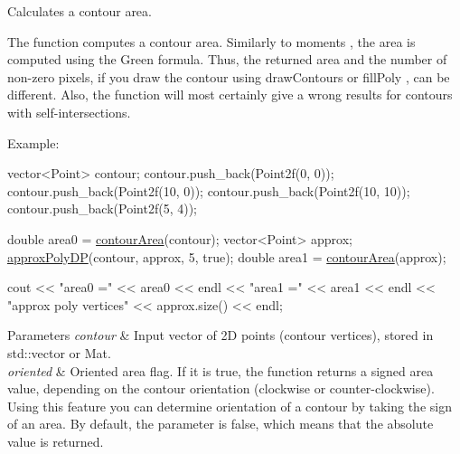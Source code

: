 Calculates a contour area. 

The function computes a contour area. Similarly to moments , the area is computed using the Green formula. Thus, the returned area and the number of non-\/zero pixels, if you draw the contour using draw\+Contours or fill\+Poly , can be different. Also, the function will most certainly give a wrong results for contours with self-\/intersections. 

Example\+: 
\begin{DoxyPre}
\begin{DoxyCode}
vector<Point> contour;
contour.push\_back(Point2f(0, 0));
contour.push\_back(Point2f(10, 0));
contour.push\_back(Point2f(10, 10));
contour.push\_back(Point2f(5, 4));

\textcolor{keywordtype}{double} area0 = \hyperlink{group__imgproc__shape_ga5de110872b0023d4176fcc7c3f2c6115}{contourArea}(contour);
vector<Point> approx;
\hyperlink{group__imgproc__shape_ga59b2a13c4f741e0898f8415d9436d8a0}{approxPolyDP}(contour, approx, 5, \textcolor{keyword}{true});
\textcolor{keywordtype}{double} area1 = \hyperlink{group__imgproc__shape_ga5de110872b0023d4176fcc7c3f2c6115}{contourArea}(approx);

cout << \textcolor{stringliteral}{"area0 ="} << area0 << endl <<
        \textcolor{stringliteral}{"area1 ="} << area1 << endl <<
        \textcolor{stringliteral}{"approx poly vertices"} << approx.size() << endl;
\end{DoxyCode}
 \end{DoxyPre}
 
\begin{DoxyParams}{Parameters}
{\em contour} & Input vector of 2D points (contour vertices), stored in std\+::vector or Mat. \\
\hline
{\em oriented} & Oriented area flag. If it is true, the function returns a signed area value, depending on the contour orientation (clockwise or counter-\/clockwise). Using this feature you can determine orientation of a contour by taking the sign of an area. By default, the parameter is false, which means that the absolute value is returned. \\
\hline
\end{DoxyParams}
\mbox{\label{group__imgproc__shape_gad55038a508ccdb2a51346a9321039983}} 
